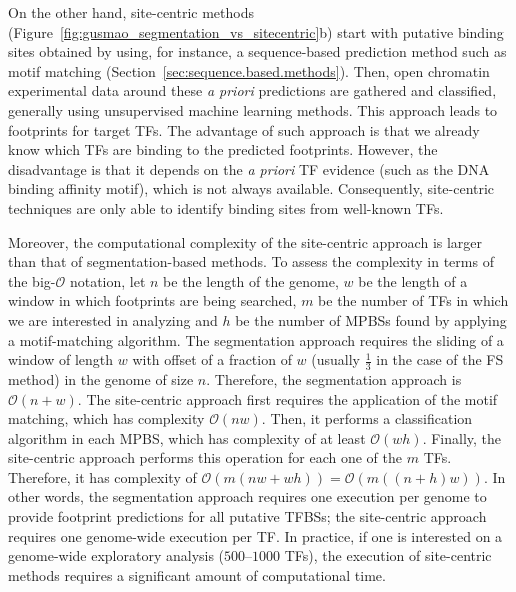 On the other hand, site-centric methods (Figure~\ref{fig:gusmao_segmentation_vs_sitecentric}b) start with putative binding sites obtained by using, for instance, a sequence-based prediction method such as motif matching (Section~\ref{sec:sequence.based.methods}). Then, open chromatin experimental data around these \emph{a priori} predictions are gathered and classified, generally using unsupervised machine learning methods. This approach leads to footprints for target TFs. The advantage of such approach is that we already know which TFs are binding to the predicted footprints. However, the disadvantage is that it depends on the \emph{a priori} TF evidence (such as the DNA binding affinity motif), which is not always available. Consequently, site-centric techniques are only able to identify binding sites from well-known TFs.

Moreover, the computational complexity of the site-centric approach is larger than that of \linebreak segmentation-based methods. To assess the complexity in terms of the big-$\mathcal{O}$ notation, let $n$ be the length of the genome, $w$ be the length of a window in which footprints are being searched, $m$ be the number of TFs in which we are interested in analyzing and $h$ be the number of MPBSs found by applying a motif-matching algorithm. The segmentation approach requires the sliding of a window of length $w$ with offset of a fraction of $w$ (usually $\frac{1}{3}$ in the case of the FS method) in the genome of size $n$. Therefore, the segmentation approach is $\mathcal{O}(n+w)$. The site-centric approach first requires the application of the motif matching, which has complexity $\mathcal{O}(nw)$. Then, it performs a classification algorithm in each MPBS, which has complexity of at least $\mathcal{O}(wh)$. Finally, the site-centric approach performs this operation for each one of the $m$ TFs. Therefore, it has complexity of $\mathcal{O}(m(nw + wh)) = \mathcal{O}(m((n+h)w))$. In other words, the segmentation approach requires one execution per genome to provide footprint predictions for all putative TFBSs; the site-centric approach requires one genome-wide execution per TF. In practice, if one is interested on a genome-wide exploratory analysis (\approxy$500$--$1000$ TFs), the execution of site-centric methods requires a significant amount of computational time.

